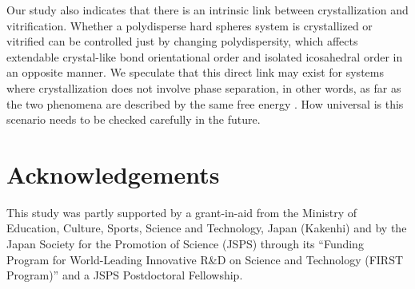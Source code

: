 \documentclass[twocolumn,superscriptaddress]{revtex4-1}
\begin{document}
Our study also indicates that there is an intrinsic link between crystallization and vitrification. 
Whether a polydisperse hard spheres system is crystallized or vitrified can be controlled just by changing 
polydispersity, which affects extendable crystal-like bond orientational order and isolated icosahedral order 
in an opposite manner.
We speculate that this direct link may exist for systems where crystallization does not involve phase separation, 
in other words, as far as the two phenomena are described by the same free energy \cite{TanakaGJPCM,TanakaJSP,TanakaR}.  
How universal is this scenario needs to be checked carefully in the future. 

\section*{Acknowledgements}
This study was partly supported by a grant-in-aid from 
the Ministry of Education, Culture, Sports, Science and Technology, Japan (Kakenhi)
and by the Japan Society for the Promotion of
Science (JSPS) through its ``Funding Program for World-Leading
Innovative R\&D on Science and Technology (FIRST Program)'' and a JSPS Postdoctoral Fellowship.






\end{document}
